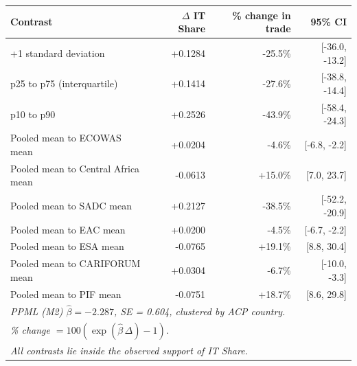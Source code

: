 \begin{tabular}{lrrr}
\midrule\midrule
Contrast & $\Delta$ IT Share & \% change in trade & 95\% CI \\
\midrule
+1 standard deviation                      & +0.1284 & -25.5\% & [-36.0, -13.2] \\
p25 to p75 (interquartile)                 & +0.1414 & -27.6\% & [-38.8, -14.4] \\
p10 to p90                                 & +0.2526 & -43.9\% & [-58.4, -24.3] \\
Pooled mean to ECOWAS mean                 & +0.0204 & -4.6\% & [-6.8, -2.2] \\
Pooled mean to Central Africa mean         & -0.0613 & +15.0\% & [7.0, 23.7] \\
Pooled mean to SADC mean                   & +0.2127 & -38.5\% & [-52.2, -20.9] \\
Pooled mean to EAC mean                    & +0.0200 & -4.5\% & [-6.7, -2.2] \\
Pooled mean to ESA mean                    & -0.0765 & +19.1\% & [8.8, 30.4] \\
Pooled mean to CARIFORUM mean              & +0.0304 & -6.7\% & [-10.0, -3.3] \\
Pooled mean to PIF mean                    & -0.0751 & +18.7\% & [8.6, 29.8] \\
\midrule\midrule
\multicolumn{4}{l}{\emph{PPML (M2) $\hat{\beta} = -2.287$, SE = 0.604, clustered by ACP country.}}\\
\multicolumn{4}{l}{\emph{\% change $= 100(\exp(\hat{\beta}\,\Delta) - 1)$.}}\\
\multicolumn{4}{p{0.85\linewidth}}{\emph{All contrasts lie inside the observed support of IT Share.}}\\
\end{tabular}
